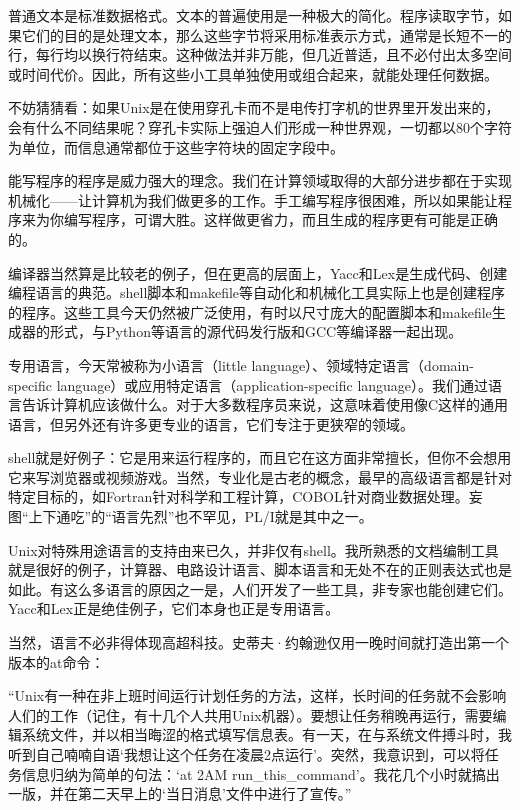\documentclass[a4paper,12pt,UTF8,twoside]{ctexbook}
\begin{document}
普通文本是标准数据格式。文本的普遍使用是一种极大的简化。程序读取字节，如果它们的目的是处理文本，那么这些字节将采用标准表示方式，通常是长短不一的行，每行均以换行符结束。这种做法并非万能，但几近普适，且不必付出太多空间或时间代价。因此，所有这些小工具单独使用或组合起来，就能处理任何数据。

不妨猜猜看：如果Unix是在使用穿孔卡而不是电传打字机的世界里开发出来的，会有什么不同结果呢？穿孔卡实际上强迫人们形成一种世界观，一切都以80个字符为单位，而信息通常都位于这些字符块的固定字段中。

能写程序的程序是威力强大的理念。我们在计算领域取得的大部分进步都在于实现机械化——让计算机为我们做更多的工作。手工编写程序很困难，所以如果能让程序来为你编写程序，可谓大胜。这样做更省力，而且生成的程序更有可能是正确的。

编译器当然算是比较老的例子，但在更高的层面上，Yacc和Lex是生成代码、创建编程语言的典范。shell脚本和makefile等自动化和机械化工具实际上也是创建程序的程序。这些工具今天仍然被广泛使用，有时以尺寸庞大的配置脚本和makefile生成器的形式，与Python等语言的源代码发行版和GCC等编译器一起出现。

专用语言，今天常被称为小语言（little language）、领域特定语言（domain-specific language）或应用特定语言（application-specific language）。我们通过语言告诉计算机应该做什么。对于大多数程序员来说，这意味着使用像C这样的通用语言，但另外还有许多更专业的语言，它们专注于更狭窄的领域。

shell就是好例子：它是用来运行程序的，而且它在这方面非常擅长，但你不会想用它来写浏览器或视频游戏。当然，专业化是古老的概念，最早的高级语言都是针对特定目标的，如Fortran针对科学和工程计算，COBOL针对商业数据处理。妄图“上下通吃”的“语言先烈”也不罕见，PL/I就是其中之一。

Unix对特殊用途语言的支持由来已久，并非仅有shell。我所熟悉的文档编制工具就是很好的例子，计算器、电路设计语言、脚本语言和无处不在的正则表达式也是如此。有这么多语言的原因之一是，人们开发了一些工具，非专家也能创建它们。Yacc和Lex正是绝佳例子，它们本身也正是专用语言。

当然，语言不必非得体现高超科技。史蒂夫·约翰逊仅用一晚时间就打造出第一个版本的at命令：

“Unix有一种在非上班时间运行计划任务的方法，这样，长时间的任务就不会影响人们的工作（记住，有十几个人共用Unix机器）。要想让任务稍晚再运行，需要编辑系统文件，并以相当晦涩的格式填写信息表。有一天，在与系统文件搏斗时，我听到自己喃喃自语‘我想让这个任务在凌晨2点运行’。突然，我意识到，可以将任务信息归纳为简单的句法：‘at 2AM run\_this\_command’。我花几个小时就搞出一版，并在第二天早上的‘当日消息’文件中进行了宣传。”
\end{document}
